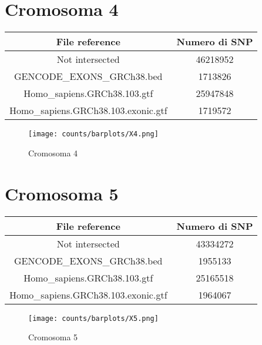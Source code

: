 \section*{Cromosoma 4}
  \begin{table}[H]\centering
	\begin{tabular}{|c|c|}
	  \hline
	  File reference & Numero di SNP \\
		\hline
		Not intersected & 46218952 \\
	  \hline
	  GENCODE\_EXONS\_GRCh38.bed &  1713826\\
	  \hline
	  Homo\_sapiens.GRCh38.103.gtf & 25947848 \\
	  \hline
	  Homo\_sapiens.GRCh38.103.exonic.gtf & 1719572 \\
	  \hline
	\end{tabular}
  \end{table}
  \begin{figure}[H]
	\texttt{[image: counts/barplots/X4.png]}
	\caption{Cromosoma 4}
	\label{fig:chr4}
  \end{figure}

\section*{Cromosoma 5}
  \begin{table}[H]\centering
	\begin{tabular}{|c|c|}
	  \hline
	  File reference & Numero di SNP \\
		\hline
		Not intersected & 43334272 \\
	  \hline
	  GENCODE\_EXONS\_GRCh38.bed & 1955133 \\
	  \hline
	  Homo\_sapiens.GRCh38.103.gtf & 25165518 \\
	  \hline
	  Homo\_sapiens.GRCh38.103.exonic.gtf & 1964067 \\
	  \hline
	\end{tabular}
  \end{table}
  \begin{figure}[H]
	\texttt{[image: counts/barplots/X5.png]}
	\caption{Cromosoma 5}
	\label{fig:chr5}
  \end{figure}

